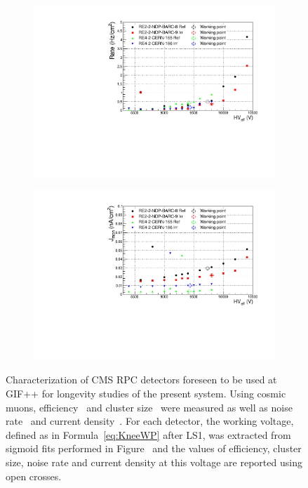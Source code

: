 \begin{figure}[H]
\begin{subfigure}{0.5\linewidth}
    		\includegraphics[width = \linewidth]{fig/chapt5/Consolidation-Noise-Rate.pdf}
        	\caption{\label{fig:consolidation:C}}
    	\end{subfigure}
    	\begin{subfigure}{0.5\linewidth}
			\centering
    		\includegraphics[width = \linewidth]{fig/chapt5/Consolidation-Current-Density.pdf}
        	\caption{\label{fig:consolidation:D}}
    	\end{subfigure}
		\caption{\label{fig:consolidation} Characterization of CMS RPC detectors foreseen to be used at GIF++ for longevity studies of the present system. Using cosmic muons, efficiency~ and cluster size~ were measured as well as noise rate~ and current density~. For each detector, the working voltage, defined as in Formula~\ref{eq:KneeWP} after LS1, was extracted from sigmoid fits performed in Figure~ and the values of efficiency, cluster size, noise rate and current density at this voltage are reported using open crosses.}
	\end{figure}
	
